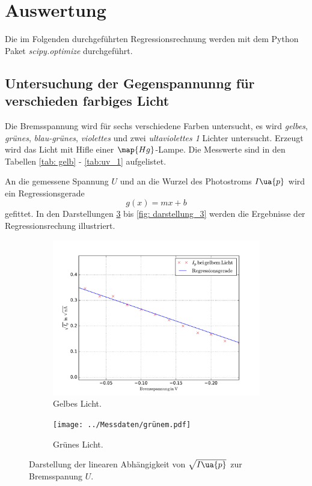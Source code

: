 \section{Auswertung}

Die im Folgenden durchgeführten Regressionsrechnung werden mit dem
Python Paket \emph{scipy.optimize}\cite{scipy} durchgeführt.

\subsection{Untersuchung der Gegenspannunng für verschieden farbiges Licht}
Die Bremsspannung wird für sechs verschiedene Farben untersucht, es wird
\emph{gelbes}, \emph{grünes}, \emph{blau-grünes}, \emph{violettes} und zwei \emph{ultaviolettes 1}
Lichter untersucht. Erzeugt wird das Licht mit Hifle einer $\map{Hg}$-Lampe.
Die Messwerte sind in den Tabellen \ref{tab: gelb} - \ref{tab:uv_1} aufgelistet.






An die gemessene Spannung $U$ und an die Wurzel des Photostroms $I\ua{p}$ wird ein
Regressionsgerade
\begin{equation}
  \label{eq:reg}
  g(x)=mx+b
\end{equation}
gefittet.
In den Darstellungen \ref{fig: darstellung_1} bis \ref{fig: darstellung_3} werden die Ergebnisse der Regressionsrechung
illustriert.
\begin{figure}
  \centering
  \begin{subfigure}{0.48\textwidth}
    \centering
    \includegraphics[width=1 \textwidth]{../Messdaten/gelbem.pdf}
    \caption{Gelbes Licht.}
    \label{fig: gelb}
  \end{subfigure}
  \begin{subfigure}{0.48\textwidth}
    \centering
    \texttt{[image: ../Messdaten/grünem.pdf]}
    \caption{Grünes Licht.}
    \label{fig: grün}
  \end{subfigure}
  \caption{Darstellung der linearen Abhängigkeit von $\sqrt{I\ua{p}}$ zur Bremsspanung $U$.}
  \label{fig: darstellung_1}
\end{figure}

